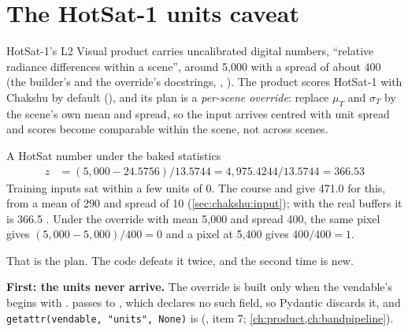 \section{The HotSat-1 units caveat}\label{sec:chakshu:hotsat}

HotSat-1's L2 Visual product carries uncalibrated digital numbers, ``relative radiance differences within a
scene'', around 5,000 with a spread of about 400 (the builder's and the override's docstrings,
, ). The
product scores HotSat-1 with Chakshu by default (), and its
plan is a \emph{per-scene override}: replace $\mu_T$ and $\sigma_T$ by the scene's own mean and spread, so the input
arrives centred with unit spread and scores become comparable within the scene, not across scenes.

\begin{worked}[label={we:chakshu:hotsat}]{A HotSat number under the baked statistics}
\begin{align*}
z &= (5{,}000-24.5756)/13.5744 = 4{,}975.4244/13.5744 = 366.53
\end{align*}
Training inputs sat within a few units of 0. The course and  give 471.0 for this,
from a mean of 290 and spread of 10 (\cref{sec:chakshu:input}); with the real buffers it is 366.5 \tagC. Under the
override with mean 5,000 and spread 400, the same pixel gives $(5{,}000-5{,}000)/400=0$ and a pixel at 5,400 gives
$400/400=1$.
\end{worked}

That is the plan. The code defeats it twice, and the second time is new.

\begin{sloppypar}\noindent\textbf{First: the units never arrive.} The override is built only when the vendable's  begins with
.  passes  to ,
which declares no such field, so Pydantic discards it, and \lstinline!getattr(vendable, "units", None)! is 
(, item 7; \cref{ch:product,ch:bandpipeline}).\end{sloppypar}

